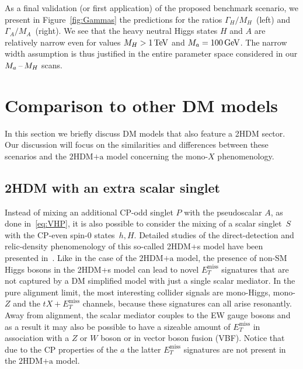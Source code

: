 \documentclass[a4paper, 11pt,notoc]{article}
\newcommand{\MET}{\ensuremath{E_T^\mathrm{miss}}\xspace}
\newcommand{\hdma}{\ensuremath{\textrm{2HDM+a}}\xspace}
\begin{document}
As a final validation (or first application) of the proposed benchmark scenario, we present in  Figure~\ref{fig:Gammas} the predictions for the ratios $\Gamma_H/M_H$~(left) and $\Gamma_A/M_A$~(right). We see that the heavy neutral Higgs states $H$ and $A$ are relatively narrow even for values $M_H > 1 \, {\rm TeV}$ and $M_a = 100 \, {\rm GeV}$.  The narrow width assumption is thus justified in the entire parameter space considered in our $M_a\hspace{0.5mm}$--$\hspace{0.5mm}M_H$ scans. 


\section{Comparison to other DM models}
\label{sec:comparison}

In this section we briefly discuss DM models that also feature a 2HDM sector.  Our discussion will focus on the similarities and differences  between these scenarios and the \hdma model  concerning the mono-$X$ phenomenology. 

\subsection*{2HDM with an extra scalar singlet}

Instead of mixing an additional CP-odd singlet $P$ with the pseudoscalar $A$, as done in~\eqref{eq:VHP}, it is also possible to consider the mixing of a  scalar singlet~$S$ with  the CP-even spin-0 states~$h,H$. Detailed studies of the direct-detection and relic-density phenomenology of this so-called 2HDM+s model have been presented in~\cite{Bell:2016ekl,Bell:2017rgi}.  Like in the case of the \hdma model, the presence of  non-SM Higgs bosons in the 2HDM+s model can lead to novel $\MET$ signatures that are not captured by a DM simplified model with just a single scalar mediator. In the pure alignment limit, the most interesting collider signals are mono-Higgs, mono-$Z$ and the $t X + \MET$  channels, because  these signatures can all arise resonantly. Away from alignment, the scalar mediator couples to the EW gauge bosons and as a result it may also be possible to have a sizeable amount of $\MET$ in association with a $Z$ or $W$ boson or in  vector boson fusion (VBF). Notice that due to the CP properties of the $a$ the latter $\MET$ signatures are not present in the \hdma model. 
\end{document}
